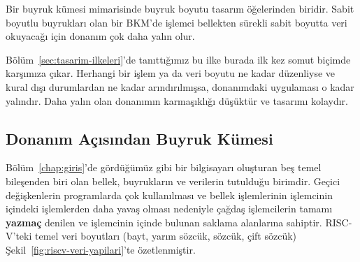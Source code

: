 Bir buyruk kümesi mimarisinde buyruk boyutu tasarım öğelerinden biridir. Sabit boyutlu buyrukları olan bir BKM'de işlemci bellekten sürekli sabit boyutta veri okuyacağı için donanım çok daha yalın olur.

\begin{tanim}
Bölüm~\ref{sec:tasarim-ilkeleri}'de tanıttığımız bu ilke burada ilk kez somut biçimde karşımıza çıkar. Herhangi bir işlem ya da veri boyutu ne kadar düzenliyse ve kural dışı durumlardan ne kadar arındırılmışsa, donanımdaki uygulaması o kadar yalındır. Daha yalın olan donanımın karmaşıklığı düşüktür ve tasarımı kolaydır.
\end{tanim}


\subsection{Donanım Açısından Buyruk Kümesi}

Bölüm~\ref{chap:giris}'de gördüğümüz gibi bir bilgisayarı oluşturan beş temel bileşenden biri olan bellek, buyrukların ve verilerin tutulduğu birimdir. Geçici değişkenlerin programlarda çok kullanılması ve bellek işlemlerinin işlemcinin içindeki işlemlerden daha yavaş olması nedeniyle çağdaş işlemcilerin tamamı \textbf{yazmaç} denilen ve işlemcinin içinde bulunan saklama alanlarına sahiptir. RISC-V'teki temel veri boyutları (bayt, yarım sözcük, sözcük, çift sözcük) Şekil~\ref{fig:riscv-veri-yapilari}'te özetlenmiştir.

